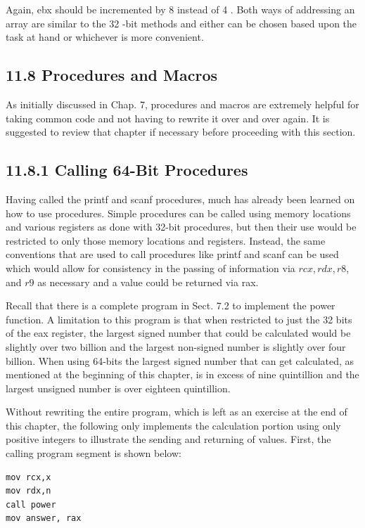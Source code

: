 \documentclass[10pt]{book}
\begin{document}
Again, ebx should be incremented by 8 instead of 4 . Both ways of addressing an array are similar to the 32 -bit methods and either can be chosen based upon the task at hand or whichever is more convenient.

\subsection*{11.8 Procedures and Macros}
As initially discussed in Chap. 7, procedures and macros are extremely helpful for taking common code and not having to rewrite it over and over again. It is suggested to review that chapter if necessary before proceeding with this section.

\subsection*{11.8.1 Calling 64-Bit Procedures}
Having called the printf and scanf procedures, much has already been learned on how to use procedures. Simple procedures can be called using memory locations and various registers as done with 32-bit procedures, but then their use would be restricted to only those memory locations and registers. Instead, the same conventions that are used to call procedures like printf and scanf can be used which would allow for consistency in the passing of information via $r c x, r d x, r 8$, and $r 9$ as necessary and a value could be returned via rax.


Recall that there is a complete program in Sect. 7.2 to implement the power function. A limitation to this program is that when restricted to just the 32 bits of the eax register, the largest signed number that could be calculated would be slightly over two billion and the largest non-signed number is slightly over four billion. When using 64-bits the largest signed number that can get calculated, as mentioned at the beginning of this chapter, is in excess of nine quintillion and the largest unsigned number is over eighteen quintillion.

Without rewriting the entire program, which is left as an exercise at the end of this chapter, the following only implements the calculation portion using only positive integers to illustrate the sending and returning of values. First, the calling program segment is shown below:

\begin{verbatim}
mov rcx,x
mov rdx,n
call power
mov answer, rax
\end{verbatim}
\end{document}
